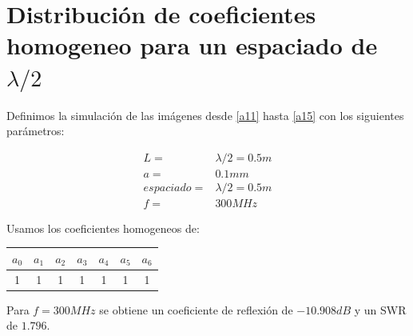\documentclass[11pt]{book}
\begin{document}
\newpage

\section{Distribución de coeficientes homogeneo para un espaciado de $\lambda/2$}

Definimos la simulación de las imágenes desde \eqref{a11} hasta \eqref{a15} con los siguientes parámetros:

\begin{align*}
	L = &\lambda/2 =  0.5m \\
	a = & 0.1mm \\
	espaciado = & \lambda / 2 = 0.5m \\
	f = & 300MHz
\end{align*}

Usamos los coeficientes homogeneos de:

\begin{tabular}{c|c|c|c|c|c|c}
	$a_0$ & $a_1$ & $a_2$ & $a_3$ & $a_4$ & $a_5$ & $a_6$ \\ \hline
	1 & 1 & 1 & 1 & 1 & 1 & 1 \\
\end{tabular}

Para $f=300MHz$ se obtiene un coeficiente de reflexión de $-10.908dB$ y un SWR de $1.796$. 
\end{document}
